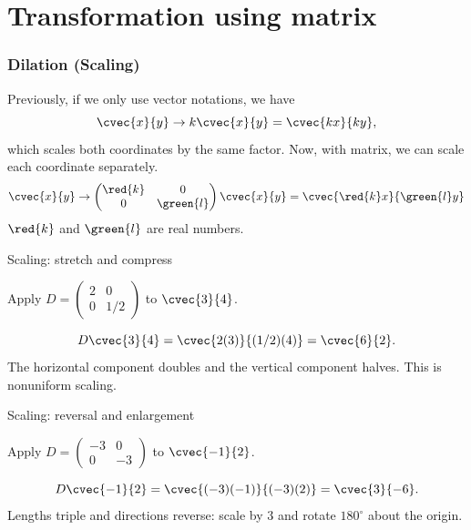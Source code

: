 \section[Transf. as Matrix]{Transformation using matrix}
\frame{\sectionpage}

\begin{frame}
\frametitle{Dilation (Scaling)}
Previously, if we only use vector notations, we have
\[ \cvec{x}{y} \to k \cvec{x}{y} = \cvec{kx}{ky},\]
which scales both coordinates by the same factor. Now, with matrix, we can scale each coordinate separately.
\[ \cvec{x}{y} \to \begin{pmatrix} \red{k} & 0 \\ 0 & \green{l} \end{pmatrix} \cvec{x}{y} = \cvec{\red{k}x}{\green{l}y}\]
$\red{k}$ and $\green{l}$ are real numbers.
\end{frame}
\begin{frame}[t]{Scaling: stretch and compress}
\small
\begin{ex}
Apply $D=\begin{pmatrix}2&0\\0&1/2\end{pmatrix}$ to $\cvec{3}{4}$.
\end{ex}
\begin{sol}
\[D\cvec{3}{4}=\cvec{2(3)}{(1/2)(4)}=\cvec{6}{2}.\] The horizontal component doubles and the vertical component halves. This is nonuniform scaling.
\end{sol}
\end{frame}

\begin{frame}[t]{Scaling: reversal and enlargement}
\small
\begin{ex}
Apply $D=\begin{pmatrix}-3&0\\0&-3\end{pmatrix}$ to $\cvec{-1}{2}$.
\end{ex}
\begin{sol}
\[D\cvec{-1}{2}=\cvec{(-3)(-1)}{(-3)(2)}=\cvec{3}{-6}.\] Lengths triple and directions reverse: scale by $3$ and rotate $180^\circ$ about the origin.
\end{sol}
\end{frame}


